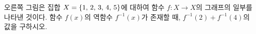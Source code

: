 \hspace*{2mm}\begin{minipage}[t]{\dimexpr\linewidth-2mm\relax}\vspace{0pt}
\noindent\begin{minipage}[t]{0.58\linewidth}\vspace{0pt}\raggedright 오른쪽 그림은 집합 $X=\{1,\mkern3mu 2,\mkern3mu 3,\mkern3mu 4,\mkern3mu 5\}$에 대하여 함수 $f:X\longrightarrow X$의 그래프의 일부를 나타낸 것이다. 함수 $f(x)$의 역함수 $f^{-1}(x)$가 존재할 때, $f^{-1}(2)+f^{-1}(4)$의 값을 구하시오.\end{minipage}\hfill\begin{minipage}[t]{0.4\linewidth}\vspace{0pt}\centering \resizebox{\ifdim\width>\linewidth\linewidth\else\width\fi}{!}{}\end{minipage}\par\end{minipage}
